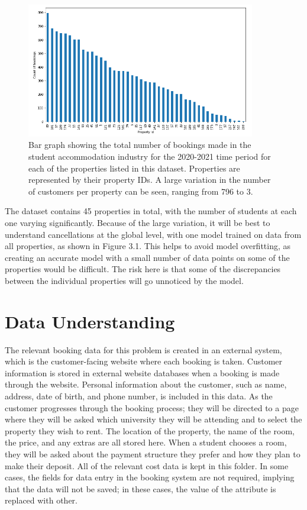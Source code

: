 \begin{figure}[H]
 \centering
 \includegraphics[width=10cm]{figures/bookings_by_property.png}
 \caption{Bar graph showing the total number of bookings made in the student accommodation industry for the 2020-2021 time period for each of the properties listed in this dataset. Properties are represented by their property IDs. A large variation in the number of customers per property can be seen, ranging from 796 to 3.}
\end{figure}


The dataset contains 45 properties in total, with the number of students at each one varying significantly. Because of the large variation, it will be best to understand cancellations at the global level, with one model trained on data from all properties, as shown in Figure 3.1. This helps to avoid model overfitting, as creating an accurate model with a small number of data points on some of the properties would be difficult. The risk here is that some of the discrepancies between the individual properties will go unnoticed by the model.

\section{Data Understanding}

The relevant booking data for this problem is created in an external system, which is the customer-facing website where each booking is taken. Customer information is stored in external website databases when a booking is made through the website. Personal information about the customer, such as name, address, date of birth, and phone number, is included in this data. As the customer progresses through the booking process; they will be directed to a page where they will be asked which university they will be attending and to select the property they wish to rent. The location of the property, the name of the room, the price, and any extras are all stored here. When a student chooses a room, they will be asked about the payment structure they prefer and how they plan to make their deposit. All of the relevant cost data is kept in this folder. In some cases, the fields for data entry in the booking system are not required, implying that the data will not be saved; in these cases, the value of the attribute is replaced with other.

